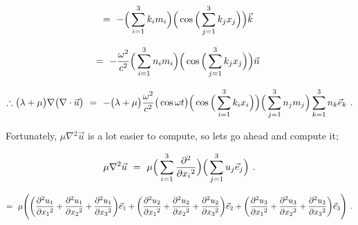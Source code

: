 \documentclass{article}
\begin{document}
\begin{equation} \label{eq:1}
= \hspace{0.125cm} - \Big( \sum_{i = 1}^{3} k_i m_i \Big) \Big( \cos \Big( \sum_{j = 1}^{3} k_j x_j \Big) \Big) \vec{k} \hspace{0.125cm} 
\end{equation}

\begin{equation} \label{eq:1}
= \hspace{0.125cm} - \frac{\omega{}^2}{c^2} \Big( \sum_{i = 1}^{3} n_i m_i \Big) \Big( \cos \Big( \sum_{j = 1}^{3} k_j x_j \Big) \Big) \vec{n} \hspace{0.125cm} 
\end{equation}

\begin{equation} \label{eq:1}
\therefore \big( \lambda + \mu \big) \nabla \big( \nabla \cdot \vec{u} \big) \hspace{0.125cm} = \hspace{0.125cm} -  \big( \lambda + \mu \big)    \frac{\omega{}^2}{c^2} \big( \cos{ \omega t } \big) \Big( \cos \Big( \sum_{i = 1}^{3} k_i x_i \Big) \Big) \Big( \sum_{j = 1}^{3} n_j m_j \Big) \sum_{k = 1}^{3} n_k \vec{e}_k \hspace{0.125cm}  .
\end{equation}

Fortunately, \begin{math} \mu \nabla{}^2 \vec{u} \end{math} is a lot easier to compute, so lets go ahead and compute it;

\begin{equation} \label{eq:1}
\mu \nabla{}^2 \vec{u} \hspace{0.125cm} = \hspace{0.125cm} \mu \Big( \sum_{i = 1}^{3} \frac{\partial{}^2}{\partial{x_i}^2} \Big) \Big( \sum_{j = 1}^{3} u_j \vec{e}_j \Big) \hspace{0.125cm}  .
\end{equation}

\begin{equation} \label{eq:1}
= \hspace{0.125cm} \mu \Bigg( \bigg( \frac{\partial{}^2 u_1}{\partial{x_1}^2} + \frac{\partial{}^2 u_1}{\partial{x_2}^2} + \frac{\partial{}^2 u_1}{\partial{x_3}^2} \bigg) \vec{e}_1 + \bigg( \frac{\partial{}^2 u_2}{\partial{x_1}^2} + \frac{\partial{}^2 u_2}{\partial{x_2}^2} + \frac{\partial{}^2 u_2}{\partial{x_3}^2} \bigg) \vec{e}_2 + \bigg( \frac{\partial{}^2 u_3}{\partial{x_1}^2} + \frac{\partial{}^2 u_3}{\partial{x_2}^2} + \frac{\partial{}^2 u_3}{\partial{x_3}^2} \bigg) \vec{e}_3 \Bigg) \hspace{0.125cm}  .
\end{equation}
\end{document}
